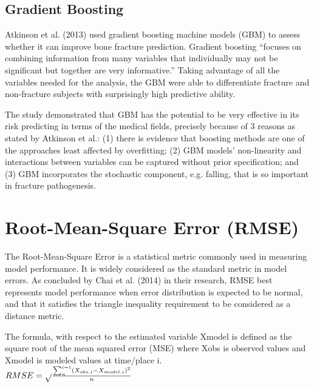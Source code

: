 ﻿\documentclass[10pt,11pt,12pt,oneside]{book}
\begin{document}
        \subsection{Gradient Boosting}
        Atkinson et al. (2013) used gradient boosting machine models (GBM) to assess whether it can improve bone fracture prediction. Gradient boosting “focuses on combining information from many variables that individually may not be significant but together are very informative.” Taking advantage of all the variables needed for the analysis, the GBM were able to differentiate fracture and non-fracture subjects with surprisingly high predictive ability.

        The study demonstrated that GBM has the potential to be very effective in its risk predicting in terms of the medical fields, precisely because of 3 reasons as stated by Atkinson et al.: (1) there is evidence that boosting methods are one of the approaches least affected by overfitting; (2) GBM models’ non-linearity and interactions between variables can be captured without prior specification; and (3) GBM incorporates the stochastic component, e.g. falling, that is so important in fracture pathogenesis. \cite{Atkinson2012}
    \section{Root-Mean-Square Error (RMSE)}
    The Root-Mean-Square Error is a statistical metric commonly used in measuring model performance. It is widely considered as the standard metric in model errors. As concluded by Chai et al. (2014) in their research, RMSE best represents model performance when error distribution is expected to be normal, and that it satisfies the triangle inequality requirement to be considered as a distance metric.
    
The formula, with respect to the estimated variable Xmodel is defined as the square root of the mean squared error (MSE) where Xobs is observed values and Xmodel is modeled values at time/place i.\\
    \begingroup
\Large
    \begin{math}
\centering
RMSE = \sqrt{}\frac{\sum_{n}^{i=1}\left ( X_{obs,i} - X_{model,i}\right )^{2}}{n}
\end{math}\\
\endgroup
\end{document}
